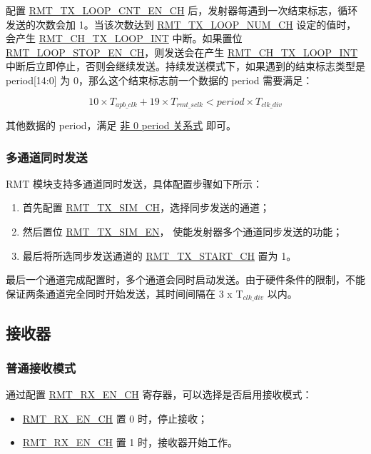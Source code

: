 \documentclass[main\_\_CN.tex]{subfiles}
\begin{document}
配置 \hyperref[fielddesc:RMTTXLOOPCNTENCHN]{RMT\_TX\_LOOP\_CNT\_EN\_CH} 后，发射器每遇到一次结束标志，循环发送的次数会加 1。当该次数达到 \hyperref[fielddesc:RMTTXLOOPNUMCHN]{RMT\_TX\_LOOP\_NUM\_CH} 设定的值时，会产生 \hyperref[int:RMTCHnTXLOOPINT]{RMT\_CH\_TX\_LOOP\_INT} 中断。如果置位 \hyperref[fielddesc:RMTLOOPSTOPENCHN]{RMT\_LOOP\_STOP\_EN\_CH}，则发送会在产生 \hyperref[int:RMTCHnTXLOOPINT]{RMT\_CH\_TX\_LOOP\_INT} 中断后立即停止，否则会继续发送。持续发送模式下，如果遇到的结束标志类型是 period[14:0] 为 0，那么这个结束标志前一个数据的 period 需要满足：

\begin{equation}
10 \times T_{apb\_clk} + 19 \times T_{rmt\_sclk} < period \times T_{clk\_div}
\end{equation}

其他数据的 period，满足 \hyperref[eq:rmt-period-value]{非 0 period 关系式} 即可。


\subsubsection{多通道同时发送}

RMT 模块支持多通道同时发送，具体配置步骤如下所示：
\begin{enumerate}
    \item 首先配置 \hyperref[regdesc:RMTTXSIMREG]{RMT\_TX\_SIM\_CH}，选择同步发送的通道；
    \item 然后置位 \hyperref[fielddesc:RMTTXSIMEN]{RMT\_TX\_SIM\_EN}， 使能发射器多个通道同步发送的功能；
    \item 最后将所选同步发送通道的 \hyperref[fielddesc:RMTTXSTARTCHN]{RMT\_TX\_START\_CH} 置为 1。
\end{enumerate}
最后一个通道完成配置时，多个通道会同时启动发送。由于硬件条件的限制，不能保证两条通道完全同时开始发送，其时间间隔在 3 x T$_{clk\_div}$ 以内。


\subsection{接收器}

\subsubsection{普通接收模式}

通过配置 \hyperref[fielddesc:RMTRXENCHM]{RMT\_RX\_EN\_CH} 寄存器，可以选择是否启用接收模式：
\begin{itemize}
    \item \hyperref[fielddesc:RMTRXENCHM]{RMT\_RX\_EN\_CH} 置 0 时，停止接收；
    \item \hyperref[fielddesc:RMTRXENCHM]{RMT\_RX\_EN\_CH} 置 1 时，接收器开始工作。
\end{itemize}
\end{document}
